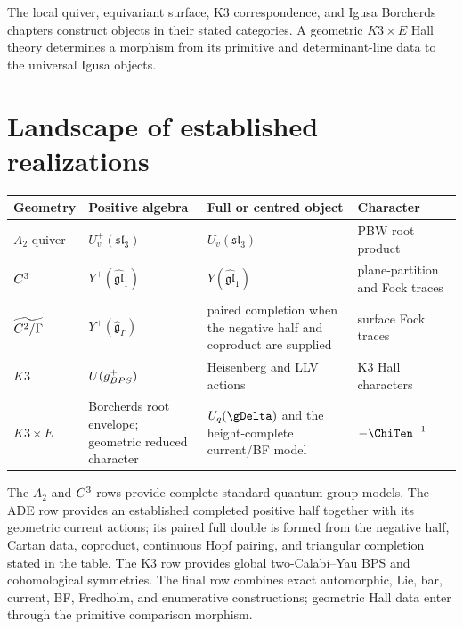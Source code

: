 The local quiver, equivariant surface, K3 correspondence, and Igusa Borcherds chapters construct objects in their stated categories.  A geometric $K3\times E$ Hall theory determines a morphism from its primitive and determinant-line data to the universal Igusa objects.

\chapter{Landscape of established realizations}
\begin{center}
\footnotesize
\begin{tabularx}{0.99\textwidth}{@{}>{\raggedright\arraybackslash}p{}>{\raggedright\arraybackslash}p{}>{\raggedright\arraybackslash}X>{\raggedright\arraybackslash}p{}@{}}
\toprule
\textbf{Geometry}&\textbf{Positive algebra}&\textbf{Full or centred object}&\textbf{Character}\\
\midrule
$A_2$ quiver&$U_v^+(\mathfrak{sl}_3)$&$U_v(\mathfrak{sl}_3)$&PBW root product\\
$C^3$&$Y^+(\widehat{\mathfrak{gl}}_1)$&$Y(\widehat{\mathfrak{gl}}_1)$&plane-partition and Fock traces\\
$\widetilde{C^2/\Gamma}$&$Y^+(\widehat{\mathfrak g}_\Gamma)$&paired completion when the negative half and coproduct are supplied&surface Fock traces\\
$K3$&$U(g_{BPS}^+)$&Heisenberg and LLV actions&K3 Hall characters\\
$K3\times E$&Borcherds root envelope; geometric reduced character&$U_q(\gDelta)$ and the height-complete current/BF model&$-\ChiTen^{-1}$\\
\bottomrule
\end{tabularx}
\end{center}
The $A_2$ and $C^3$ rows provide complete standard quantum-group models. The ADE row provides an established completed positive half together with its geometric current actions; its paired full double is formed from the negative half, Cartan data, coproduct, continuous Hopf pairing, and triangular completion stated in the table. The K3 row provides global two-Calabi--Yau BPS and cohomological symmetries. The final row combines exact automorphic, Lie, bar, current, BF, Fredholm, and enumerative constructions; geometric Hall data enter through the primitive comparison morphism.

